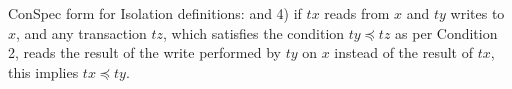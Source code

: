 \documentclass[acmlarge, ,11pt]{acmart}
\begin{document}
\begin{definition}{ConSpec form for Isolation definitions:}
    and 4) if $\mathit{tx}$ reads from $x$ and  $ {\mathit{ty}}$ writes to $x$, and  any transaction  $\mathit{tz}$, which satisfies the condition $\mathit{ty} \preccurlyeq \mathit{tz}$ as per Condition 2, reads the result of the write performed by $\mathit{ty}$ on $x$ instead of the result  of $\mathit{tx}$, this implies $\mathit{tx} \preccurlyeq \mathit{ty}$.  %
\end{definition} 
\end{document}
